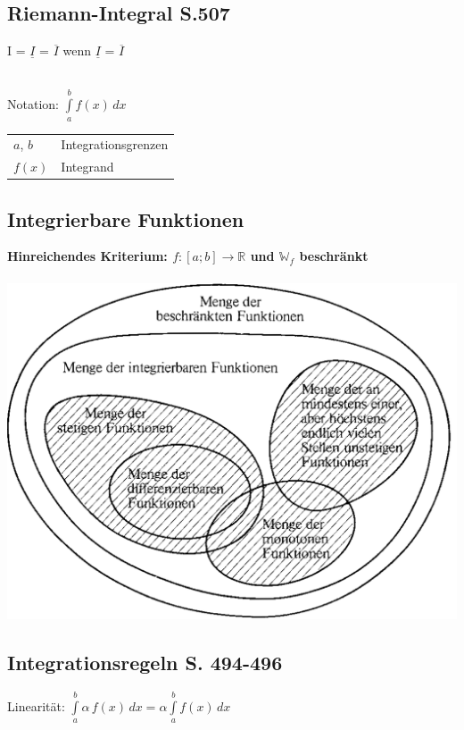 		\subsection{Riemann-Integral S.507}
		I = $\underline{I}$ = $\overline{I}$ wenn $\underline{I}$ = $\overline{I}$\\
		\\		
		\begin{minipage}{0.45\linewidth}
		Notation: $ \int \limits_{a}^{b} f(x)\, dx $
		\end{minipage}				
		\hfill
		\begin{minipage}{0.45\linewidth}
		\begin{tabular}{ll}
		$a$, $b$ & Integrationsgrenzen \\
		$f(x)$ & Integrand\\
		\end{tabular}
		\end{minipage}	
		
	
		
		\subsection{Integrierbare Funktionen}
		\textbf{Hinreichendes Kriterium: $f: [a;b] \rightarrow \mathbb{R}$ und $\mathbb{W}_f$ beschränkt}		 \\
		\\	
		\includegraphics[width=0.7\linewidth]{Bilder/integrierbare-funktionen}
		
		\pagebreak
		
		\subsection{Integrationsregeln S. 494-496}
		Linearität: $\int \limits_{a}^{b} \alpha \, f(x) \, dx = \alpha \int \limits_{a}^{b} f(x)\, dx$ 
		
